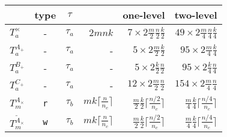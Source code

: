 \begin{figure}[!t]
\centering
{\footnotesize
  \begin{tabular}{l| ccrrr}
  \whline
                                        & type
                                        & $\tau$
                                        & \dgemm{}
                                        & one-level 
                                        & two-level  \\
\hline
  $T_{a}^{\times}$                      & -
                                        & $\tau_{a}$
                                        & $ 2 m  n  k $
                                        & $7\times2\frac{m}{2}\frac{n}{2}\frac{k}{2}$
                                        & $49\times2\frac{m}{4}\frac{n}{4}\frac{k}{4}$ \\
$T_{a}^{A_{+}}$                           & -
                                        & $\tau_{a}$
                                        & -
                                        & $5\times2\frac{m}{2} \frac{k}{2}$
                                        & $95\times2\frac{m}{4}\frac{k}{4}$ \\
  $T_{a}^{B_{+}}$                           & -
                                        & $\tau_{a}$
                                        & -
                                        & $5\times2\frac{k}{2} \frac{n}{2}$
                                        & $95\times2\frac{k}{4}\frac{n}{4}$ \\
  $T_{a}^{C_{+}}$                           & -
                                        & $\tau_{a}$
                                        & -
                                        & $12\times2\frac{m}{2}\frac{n}{2}$
                                        & $154\times2\frac{m}{4}\frac{n}{4}$ \\
  \hline
  $T_{m}^{A_{\times}}$                  & \texttt{r}
                                        & $\tau_{b}$
                                        & $mk \lceil \frac{n}{n_c} \rceil$
                                        & $\frac{m}{2} \frac{k}{2} \lceil \frac{n/2}{n_c} \rceil$
                                        & $\frac{m}{4} \frac{k}{4} \lceil \frac{n/4}{n_c} \rceil$ \\
  $T_{m}^{{\widetilde A}_{\times}}$     & \texttt{w}
                                        & $\tau_{b}$
                                        & $mk \lceil \frac{n}{n_c} \rceil$
                                        & $\frac{m}{2} \frac{k}{2} \lceil \frac{n/2}{n_c} \rceil$
                                        & $\frac{m}{4} \frac{k}{4} \lceil \frac{n/4}{n_c} \rceil$ \\

\end{tabular}}
\end{figure}
